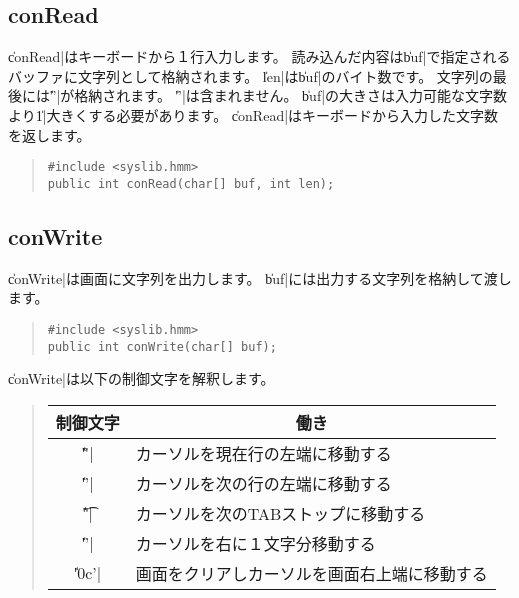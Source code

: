 \subsection{conRead}

\|conRead|はキーボードから１行入力します。
読み込んだ内容は\|buf|で指定されるバッファに文字列として格納されます。
\|len|は\|buf|のバイト数です。
文字列の最後には\|'\0'|が格納されます。
\|'\n'|は含まれません。
\|buf|の大きさは入力可能な文字数より\|1|大きくする必要があります。
\|conRead|はキーボードから入力した文字数を返します。

\begin{quote}
\begin{verbatim}
#include <syslib.hmm>
public int conRead(char[] buf, int len);
\end{verbatim}
\end{quote}

\subsection{conWrite}

\|conWrite|は画面に文字列を出力します。
\|buf|には出力する文字列を格納して渡します。

\begin{quote}
\begin{verbatim}
#include <syslib.hmm>
public int conWrite(char[] buf);
\end{verbatim}
\end{quote}

\|conWrite|は以下の制御文字を解釈します。

\begin{quote}
\begin{tabular}{c|l}
\multicolumn{1}{c|}{制御文字} & \multicolumn{1}{c}{働き} \\\hline
\|'\r'| & カーソルを現在行の左端に移動する \\
\|'\n'| & カーソルを次の行の左端に移動する \\
\|'\t'| & カーソルを次のTABストップに移動する \\
\|'\x08'| & カーソルを右に１文字分移動する \\
\|'\x0c'| & 画面をクリアしカーソルを画面右上端に移動する \\
\end{tabular}
\end{quote}
